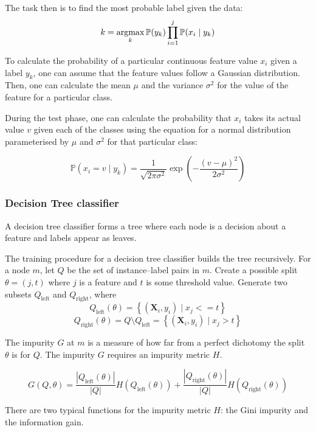         The task then is to find the most probable label given the data: $$k = \operatorname*{argmax}_k \mathbb{P}(y_k) \prod\limits_{i=1}^{j} \mathbb{P}(x_i \mid y_k)$$
      
        To calculate the probability of a particular continuous feature value $x_i$ given a label $y_k$, one can assume that the feature values follow a Gaussian distribution. Then, one can calculate the mean $\mu$ and the variance $\sigma^2$ for the value of the feature for a particular class.
      
        During the test phase, one can calculate the probability that $x_i$ takes its actual value $v$ given each of the classes using the equation for a normal distribution parameterised by $\mu$ and $\sigma^2$ for that particular class:
      
        $$\mathbb{P}(x_i = v \mid y_k) = \frac{1}{\sqrt{2 \pi \sigma^2}} \exp \left(-\frac{(v - \mu)^2}{2 \sigma^2}\right)$$
        
      \subsubsection{Decision Tree classifier}
        A decision tree classifier forms a tree where each node is a decision about a feature and labels appear as leaves.
        
        The training procedure for a decision tree classifier builds the tree recursively. For a node $m$, let $Q$ be the set of instance--label pairs in $m$. Create a possible split $\theta = (j, t)$ where $j$ is a feature and $t$ is some threshold value. Generate two subsets $Q_\mathrm{left}$ and $Q_\mathrm{right}$, where 
        $$Q_\mathrm{left}(\theta) = \left\{ (\mathbf{X}_i,y_i) \mid x_j <= t \right \}$$
        $$Q_\mathrm{right}(\theta) = Q \setminus Q_\mathrm{left} = \left\{ (\mathbf{X}_i,y_i) \mid x_j > t \right \}$$
      
        The impurity $G$ at $m$ is a measure of how far from a perfect dichotomy the split $\theta$ is for $Q$. The impurity $G$ requires an impurity metric $H$.
      
        $$G(Q, \theta) = \frac{|Q_\mathrm{left}(\theta)|}{|Q|} H(Q_\mathrm{left}(\theta)) + \frac{|Q_\mathrm{right}(\theta)|}{|Q|} H(Q_\mathrm{right}(\theta))$$
        
        
        
        There are two typical functions for the impurity metric $H$: the Gini impurity and the information gain. 
        
